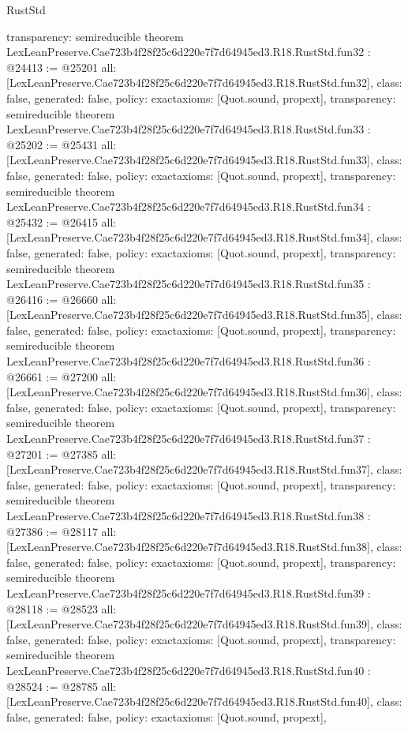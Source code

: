\begin{lexlean}{RustStd}
\begin{coremodule}
{  transparency: semireducible
}
theorem LexLeanPreserve.Cae723b4f28f25c6d220e7f7d64945ed3.R18.RustStd.fun32 : @24413 := @25201 {
  all: [LexLeanPreserve.Cae723b4f28f25c6d220e7f7d64945ed3.R18.RustStd.fun32],
  class: false,
  generated: false,
  policy: exact{axioms: [Quot.sound, propext]},
  transparency: semireducible
}
theorem LexLeanPreserve.Cae723b4f28f25c6d220e7f7d64945ed3.R18.RustStd.fun33 : @25202 := @25431 {
  all: [LexLeanPreserve.Cae723b4f28f25c6d220e7f7d64945ed3.R18.RustStd.fun33],
  class: false,
  generated: false,
  policy: exact{axioms: [Quot.sound, propext]},
  transparency: semireducible
}
theorem LexLeanPreserve.Cae723b4f28f25c6d220e7f7d64945ed3.R18.RustStd.fun34 : @25432 := @26415 {
  all: [LexLeanPreserve.Cae723b4f28f25c6d220e7f7d64945ed3.R18.RustStd.fun34],
  class: false,
  generated: false,
  policy: exact{axioms: [Quot.sound, propext]},
  transparency: semireducible
}
theorem LexLeanPreserve.Cae723b4f28f25c6d220e7f7d64945ed3.R18.RustStd.fun35 : @26416 := @26660 {
  all: [LexLeanPreserve.Cae723b4f28f25c6d220e7f7d64945ed3.R18.RustStd.fun35],
  class: false,
  generated: false,
  policy: exact{axioms: [Quot.sound, propext]},
  transparency: semireducible
}
theorem LexLeanPreserve.Cae723b4f28f25c6d220e7f7d64945ed3.R18.RustStd.fun36 : @26661 := @27200 {
  all: [LexLeanPreserve.Cae723b4f28f25c6d220e7f7d64945ed3.R18.RustStd.fun36],
  class: false,
  generated: false,
  policy: exact{axioms: [Quot.sound, propext]},
  transparency: semireducible
}
theorem LexLeanPreserve.Cae723b4f28f25c6d220e7f7d64945ed3.R18.RustStd.fun37 : @27201 := @27385 {
  all: [LexLeanPreserve.Cae723b4f28f25c6d220e7f7d64945ed3.R18.RustStd.fun37],
  class: false,
  generated: false,
  policy: exact{axioms: [Quot.sound, propext]},
  transparency: semireducible
}
theorem LexLeanPreserve.Cae723b4f28f25c6d220e7f7d64945ed3.R18.RustStd.fun38 : @27386 := @28117 {
  all: [LexLeanPreserve.Cae723b4f28f25c6d220e7f7d64945ed3.R18.RustStd.fun38],
  class: false,
  generated: false,
  policy: exact{axioms: [Quot.sound, propext]},
  transparency: semireducible
}
theorem LexLeanPreserve.Cae723b4f28f25c6d220e7f7d64945ed3.R18.RustStd.fun39 : @28118 := @28523 {
  all: [LexLeanPreserve.Cae723b4f28f25c6d220e7f7d64945ed3.R18.RustStd.fun39],
  class: false,
  generated: false,
  policy: exact{axioms: [Quot.sound, propext]},
  transparency: semireducible
}
theorem LexLeanPreserve.Cae723b4f28f25c6d220e7f7d64945ed3.R18.RustStd.fun40 : @28524 := @28785 {
  all: [LexLeanPreserve.Cae723b4f28f25c6d220e7f7d64945ed3.R18.RustStd.fun40],
  class: false,
  generated: false,
  policy: exact{axioms: [Quot.sound, propext]},
}
\end{coremodule}
\end{lexlean}

